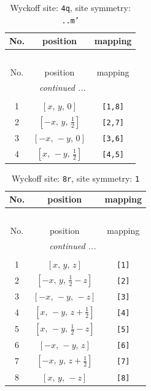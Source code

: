 \documentclass[fleqn,8pt]{jsarticle}
\begin{document}
\renewcommand{\arraystretch}{1.2}
\begin{longtable}{ccc}
\caption{Wyckoff site: {\tt 4q}, site symmetry: {\tt ..m'}}
 \\
 \hline \hline
No. & position & mapping \\ \hline \endfirsthead

\multicolumn{2}{l}{\tablename\ \thetable{}} \\
 \hline \hline
No. & position & mapping \\ \hline \endhead

 \hline \hline
\multicolumn{2}{r}{\footnotesize\it continued ...} \\ \endfoot

 \hline \hline
\multicolumn{2}{r}{} \\ \endlastfoot

1 & $\left[ x,\, y,\, 0 \right]$ & {\tt [1,8]} \\ \hline
2 & $\left[ - x,\, y,\, \frac{1}{2} \right]$ & {\tt [2,7]} \\ \hline
3 & $\left[ - x,\, - y,\, 0 \right]$ & {\tt [3,6]} \\ \hline
4 & $\left[ x,\, - y,\, \frac{1}{2} \right]$ & {\tt [4,5]} \\
\end{longtable}
\renewcommand{\arraystretch}{1.2}
\begin{longtable}{ccc}
\caption{Wyckoff site: {\tt 8r}, site symmetry: {\tt 1}}
 \\
 \hline \hline
No. & position & mapping \\ \hline \endfirsthead

\multicolumn{2}{l}{\tablename\ \thetable{}} \\
 \hline \hline
No. & position & mapping \\ \hline \endhead

 \hline \hline
\multicolumn{2}{r}{\footnotesize\it continued ...} \\ \endfoot

 \hline \hline
\multicolumn{2}{r}{} \\ \endlastfoot

1 & $\left[ x,\, y,\, z \right]$ & {\tt [1]} \\ \hline
2 & $\left[ - x,\, y,\, \frac{1}{2} - z \right]$ & {\tt [2]} \\ \hline
3 & $\left[ - x,\, - y,\, - z \right]$ & {\tt [3]} \\ \hline
4 & $\left[ x,\, - y,\, z + \frac{1}{2} \right]$ & {\tt [4]} \\ \hline
5 & $\left[ x,\, - y,\, \frac{1}{2} - z \right]$ & {\tt [5]} \\ \hline
6 & $\left[ - x,\, - y,\, z \right]$ & {\tt [6]} \\ \hline
7 & $\left[ - x,\, y,\, z + \frac{1}{2} \right]$ & {\tt [7]} \\ \hline
8 & $\left[ x,\, y,\, - z \right]$ & {\tt [8]} \\
\end{longtable}
\end{document}
